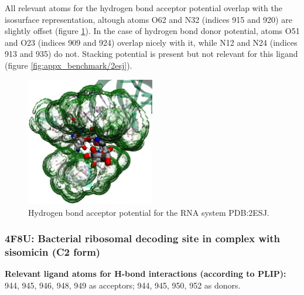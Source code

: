       All relevant atoms for the hydrogen bond acceptor potential overlap with the isosurface representation, altough atoms O62 and N32 (indices 915 and 920) are slightly offset (figure \ref{fig:benchmark/2esj}). In the case of hydrogen bond donor potential, atoms O51 and O23 (indices 909 and 924) overlap nicely with it, while N12 and N24 (indices 913 and 935) do not. Stacking potential is present but not relevant for this ligand (figure \ref{fig:appx_benchmark/2esj}).

      \begin{figure}[H]
        \centering
        \includegraphics[width=0.5\textwidth]{figures/results/benchmark_rna/2esj.png}
        \caption{\label{fig:benchmark/2esj} Hydrogen bond acceptor potential for the RNA system PDB:2ESJ.}
      \end{figure}
    \pagebreak

    \subsubsection{4F8U: Bacterial ribosomal decoding site in complex with sisomicin (C2 form)}
      \textbf{Relevant ligand atoms for H-bond interactions (according to PLIP):} 944, 945, 946, 948, 949 as acceptors; 944, 945, 950, 952 as donors.

